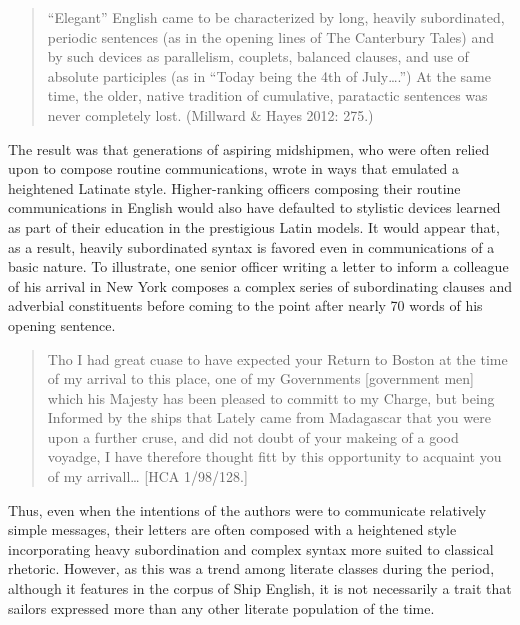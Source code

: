 \documentclass[12pt]{article}
\newenvironment{styleStandard}{\renewcommand\baselinestretch{1.0}\setlength\leftskip{0cm}\setlength\rightskip{0cm plus 1fil}\setlength\parindent{0cm}\setlength\parfillskip{0pt plus 1fil}\setlength\parskip{0in plus 1pt}\writerlistparindent\writerlistleftskip\leavevmode\normalfont\normalsize\writerlistlabel\ignorespaces}{\unskip\vspace{0in plus 1pt}\par}
\newcommand\writerlistleftskip{}
\newcommand\writerlistparindent{}
\newcommand\writerlistlabel{}
\begin{document}
\begin{quotation}
“Elegant” English came to be characterized by long, heavily subordinated, periodic sentences (as in the opening lines of The Canterbury Tales) and by such devices as parallelism, couplets, balanced clauses, and use of absolute participles (as in “Today being the 4th of July….”) At the same time, the older, native tradition of cumulative, paratactic sentences was never completely lost. (Millward \& Hayes 2012: 275.)

\end{quotation}
\begin{styleStandard}
The result was that generations of aspiring midshipmen, who were often relied upon to compose routine communications, wrote in ways that emulated a heightened Latinate style. Higher-ranking officers composing their routine communications in English would also have defaulted to stylistic devices learned as part of their education in the prestigious Latin models. It would appear that, as a result, heavily subordinated syntax is favored even in communications of a basic nature. To illustrate, one senior officer writing a letter to inform a colleague of his arrival in New York composes a complex series of subordinating clauses and adverbial constituents before coming to the point after nearly 70 words of his opening sentence.
\end{styleStandard}


\begin{quotation}
Tho I had great cuase to have expected your Return to Boston at the time of my arrival to this place, one of my Governments [government men] which his Majesty has been pleased to committ to my Charge, but being Informed by the ships that Lately came from Madagascar that you were upon a further cruse, and did not doubt of your makeing of a good voyadge, I have therefore thought fitt by this opportunity to acquaint you of my arrivall… [HCA 1/98/128.]

\end{quotation}
\begin{styleStandard}
Thus, even when the intentions of the authors were to communicate relatively simple messages, their letters are often composed with a heightened style incorporating heavy subordination and complex syntax more suited to classical rhetoric. However, as this was a trend among literate classes during the period, although it features in the corpus of Ship English, it is not necessarily a trait that sailors expressed more than any other literate population of the time. 
\end{styleStandard}
\end{document}
